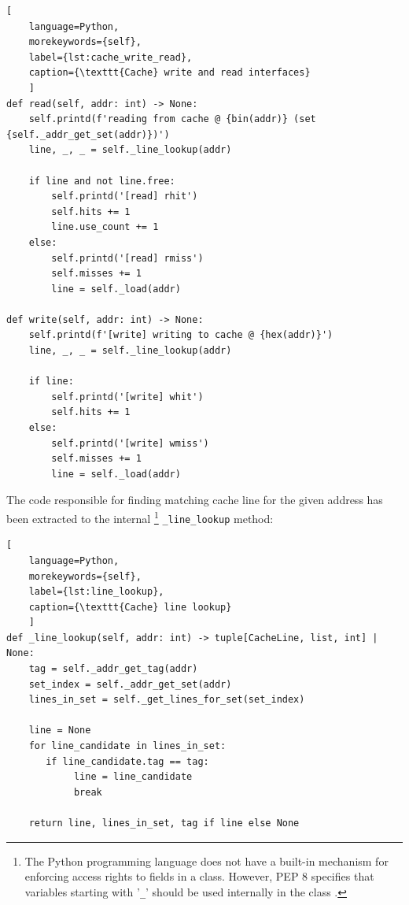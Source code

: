 \begin{center}
\centering
\begin{minipage}{\linewidth}
\begin{lstlisting}[
    language=Python,
	morekeywords={self},
    label={lst:cache_write_read},
    caption={\texttt{Cache} write and read interfaces}
    ]
def read(self, addr: int) -> None:
    self.printd(f'reading from cache @ {bin(addr)} (set {self._addr_get_set(addr)})')
    line, _, _ = self._line_lookup(addr)

    if line and not line.free:
        self.printd('[read] rhit')
        self.hits += 1
        line.use_count += 1
    else:
        self.printd('[read] rmiss')
        self.misses += 1
        line = self._load(addr)

def write(self, addr: int) -> None:
    self.printd(f'[write] writing to cache @ {hex(addr)}')
    line, _, _ = self._line_lookup(addr)

    if line:
        self.printd('[write] whit')
        self.hits += 1
    else:
        self.printd('[write] wmiss')
        self.misses += 1
        line = self._load(addr)
\end{lstlisting}
\end{minipage}
\end{center}

\noindent The code responsible for finding matching cache line for the given address has been extracted to the internal \footnote{The Python programming language does not have a
built-in mechanism for enforcing access rights to fields in a class. However, PEP 8 specifies that variables starting with '\texttt{\_}' should be used internally in the class
\cite{pep8}.} \texttt{\_line\_lookup} method:

\begin{center}
\centering
\begin{minipage}{\linewidth}
\begin{lstlisting}[
    language=Python,
	morekeywords={self},
    label={lst:line_lookup},
    caption={\texttt{Cache} line lookup}
    ]
def _line_lookup(self, addr: int) -> tuple[CacheLine, list, int] | None:
    tag = self._addr_get_tag(addr)
    set_index = self._addr_get_set(addr)
    lines_in_set = self._get_lines_for_set(set_index)

    line = None
    for line_candidate in lines_in_set:
       if line_candidate.tag == tag:
            line = line_candidate
            break

    return line, lines_in_set, tag if line else None
\end{lstlisting}
\end{minipage}
\end{center}

